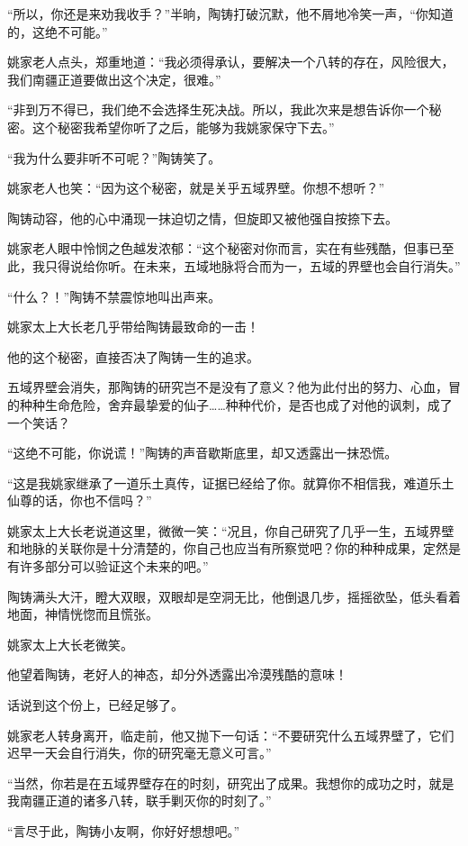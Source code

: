 \begin{this_body}
“所以，你还是来劝我收手？”半晌，陶铸打破沉默，他不屑地冷笑一声，“你知道的，这绝不可能。”

姚家老人点头，郑重地道：“我必须得承认，要解决一个八转的存在，风险很大，我们南疆正道要做出这个决定，很难。”

“非到万不得已，我们绝不会选择生死决战。所以，我此次来是想告诉你一个秘密。这个秘密我希望你听了之后，能够为我姚家保守下去。”

“我为什么要非听不可呢？”陶铸笑了。

姚家老人也笑：“因为这个秘密，就是关乎五域界壁。你想不想听？”

陶铸动容，他的心中涌现一抹迫切之情，但旋即又被他强自按捺下去。

姚家老人眼中怜悯之色越发浓郁：“这个秘密对你而言，实在有些残酷，但事已至此，我只得说给你听。在未来，五域地脉将合而为一，五域的界壁也会自行消失。”

“什么？！”陶铸不禁震惊地叫出声来。

姚家太上大长老几乎带给陶铸最致命的一击！

他的这个秘密，直接否决了陶铸一生的追求。

五域界壁会消失，那陶铸的研究岂不是没有了意义？他为此付出的努力、心血，冒的种种生命危险，舍弃最挚爱的仙子……种种代价，是否也成了对他的讽刺，成了一个笑话？

“这绝不可能，你说谎！”陶铸的声音歇斯底里，却又透露出一抹恐慌。

“这是我姚家继承了一道乐土真传，证据已经给了你。就算你不相信我，难道乐土仙尊的话，你也不信吗？”

姚家太上大长老说道这里，微微一笑：“况且，你自己研究了几乎一生，五域界壁和地脉的关联你是十分清楚的，你自己也应当有所察觉吧？你的种种成果，定然是有许多部分可以验证这个未来的吧。”

陶铸满头大汗，瞪大双眼，双眼却是空洞无比，他倒退几步，摇摇欲坠，低头看着地面，神情恍惚而且慌张。

姚家太上大长老微笑。

他望着陶铸，老好人的神态，却分外透露出冷漠残酷的意味！

话说到这个份上，已经足够了。

姚家老人转身离开，临走前，他又抛下一句话：“不要研究什么五域界壁了，它们迟早一天会自行消失，你的研究毫无意义可言。”

“当然，你若是在五域界壁存在的时刻，研究出了成果。我想你的成功之时，就是我南疆正道的诸多八转，联手剿灭你的时刻了。”

“言尽于此，陶铸小友啊，你好好想想吧。”


\end{this_body}
